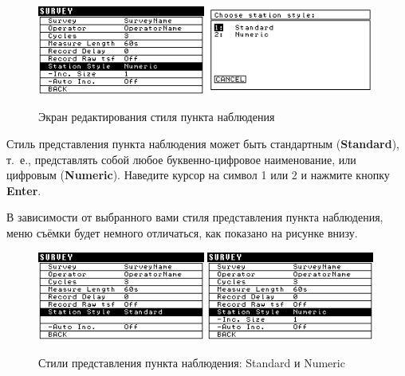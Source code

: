 \begin{figure}[H]
  \centering
  \includegraphics[width=0.49\textwidth]{figures/the_station_style_editing_screen_1}
  \includegraphics[width=0.49\textwidth]{figures/the_station_style_editing_screen_2}
  \caption{Экран редактирования стиля пункта наблюдения}
  \label{fig:the_station_style_editing_screen}
\end{figure}

Стиль представления пункта наблюдения может быть стандартным
(\textbf{Standard}), т.~е., представлять собой любое буквенно-цифровое
наименование, или цифровым (\textbf{Numeric}). Наведите курсор на символ 1 или 2
и нажмите кнопку \textbf{Enter}.

В зависимости от выбранного вами стиля представления пункта наблюдения, меню
съёмки будет немного отличаться, как показано на рисунке внизу.

\begin{figure}[H]
  \centering
  \includegraphics[width=0.49\textwidth]{figures/station_style_standard_vs_numeric_1}
  \includegraphics[width=0.49\textwidth]{figures/station_style_standard_vs_numeric_2}
  \caption{Стили представления пункта наблюдения: Standard и Numeric}
  \label{fig:station_style_standard_vs_numeric}
\end{figure}

